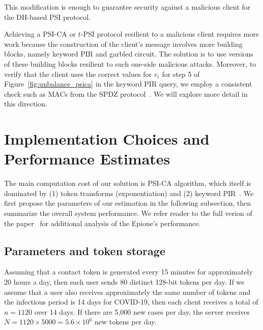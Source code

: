 \documentclass[11pt]{article} %
\newcommand{\figureref}[1]{Figure~\ref{#1}}
\newcommand{\dect}{\textsf{Epione}\xspace}
\newcommand{\tpsi}{$t$-PSI\xspace}
\newcommand{\psica}{PSI-CA\xspace}
\newcommand{\remove}[1]{}
\begin{document}
{	This modification is enough to guarantee security against a malicious client for the DH-based PSI protocol. 
	
	Achieving a \psica or \tpsi protocol resilient to a malicious client requires more work because the construction of the client's message involves more building blocks, namely keyword PIR and garbled circuit. The solution is to use versions of these building blocks resilient to such one-side malicious attacks. Moreover, to verify that the client uses the correct values for $v_i$ for step 5 of \figureref{fig:unbalance_psica} in the keyword PIR query, we employ a consistent check such as  MACs from the SPDZ protocol~\cite{C:DPSZ12}. We will explore more detail in this direction.  
	
}

\section{Implementation Choices and Performance Estimates}
\label{subs:perf}

\remove{In this section we consider some important implementation decisions and estimate the performance of \dect in order to show that the system is feasible in practice. While some performance optimizations are assumed in order to make the system realistic, we aim to be conservative with our estimates in order to give a loose upper bound to what can be expected for a practical implementation of the system.}

The main computation cost of our solution is \psica algorithm, which itself is dominated by (1) token transforms (exponentiation) and (2) keyword PIR~\cite{SP:ACLS18, EPRINT:ALPRSSY19}. We first propose the parameters of our estimation in the following subsection, then \remove{analyze the performance of PIR in single-server operation, PIR in two-server operation, token transforms, and finally} summarize the overall system performance. We refer reader  to the full verion of the paper~\cite{epione} for additional analysis of the \dect's performance.

\subsection{Parameters and token storage}
\label{subs:db-params}

Assuming that a contact token is generated every 15 minutes for approximately 20 hours a day, then each user sends 80 distinct 128-bit tokens per day. If we assume that a user also receives approximately the same number of tokens and the infectious period is 14 days for COVID-19, then each client receives a total of $n=1120$ over 14 days. If there are 5,000 new cases per day, the server receives $N = 1120 \times 5000 = 5.6 \times 10^6$ new tokens per day.
\end{document}

